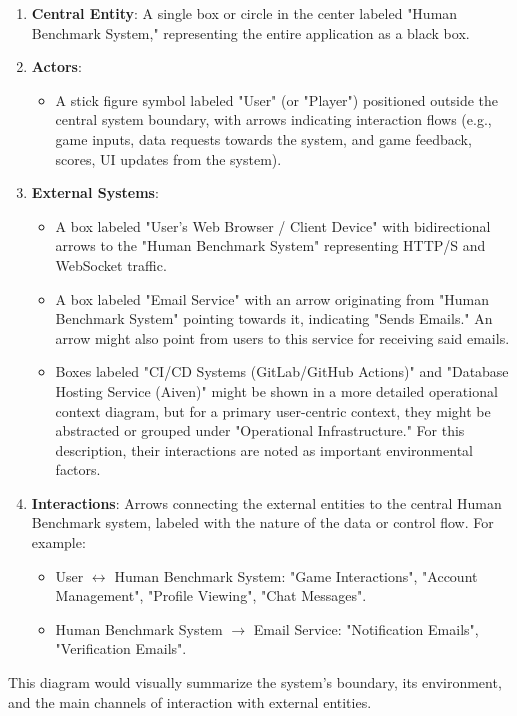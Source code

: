 \begin{enumerate}
    \item \textbf{Central Entity}: A single box or circle in the center labeled "Human Benchmark System," representing the entire application as a black box.
    \item \textbf{Actors}:
    \begin{itemize}
        \item A stick figure symbol labeled "User" (or "Player") positioned outside the central system boundary, with arrows indicating interaction flows (e.g., game inputs, data requests towards the system, and game feedback, scores, UI updates from the system).
    \end{itemize}
    \item \textbf{External Systems}:
    \begin{itemize}
        \item A box labeled "User's Web Browser / Client Device" with bidirectional arrows to the "Human Benchmark System" representing HTTP/S and WebSocket traffic.
        \item A box labeled "Email Service" with an arrow originating from "Human Benchmark System" pointing towards it, indicating "Sends Emails." An arrow might also point from users to this service for receiving said emails.
        \item Boxes labeled "CI/CD Systems (GitLab/GitHub Actions)" and "Database Hosting Service (Aiven)" might be shown in a more detailed operational context diagram, but for a primary user-centric context, they might be abstracted or grouped under "Operational Infrastructure." For this description, their interactions are noted as important environmental factors.
    \end{itemize}
    \item \textbf{Interactions}: Arrows connecting the external entities to the central Human Benchmark system, labeled with the nature of the data or control flow. For example:
    \begin{itemize}
        \item User $\leftrightarrow$ Human Benchmark System: "Game Interactions", "Account Management", "Profile Viewing", "Chat Messages".
        \item Human Benchmark System $\rightarrow$ Email Service: "Notification Emails", "Verification Emails".
    \end{itemize}
\end{enumerate}
This diagram would visually summarize the system's boundary, its environment, and the main channels of interaction with external entities.

